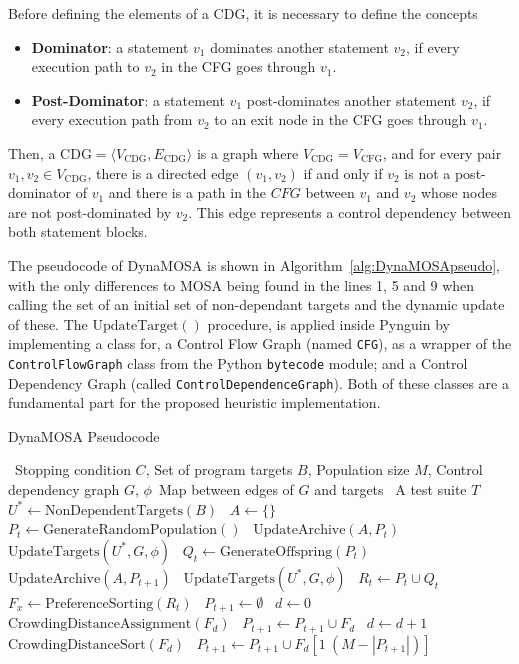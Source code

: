 \documentclass[%
  chapterprefix=false,%
  open=right,%
  twoside=true,%
  paper=a4,%
  logofile={Figures/logo.png},%
  thesistype=master,%
  UKenglish,%
]{se2thesis}
\newcommand{\classname}[1]{\texttt{#1}}
\begin{document}
Before defining the elements of a CDG, it is necessary to define the concepts
\begin{itemize}
  \item \textbf{Dominator}: a statement \(v_1\) dominates another statement \(v_2\), if every execution path to \(v_2\) in the CFG goes through \(v_1\).
  \item \textbf{Post-Dominator}: a statement \(v_1\) post-dominates another statement \(v_2\), if every execution path from \(v_2\) to an exit node in the CFG goes through \(v_1\).
\end{itemize}
Then, a \(\text{CDG} = \langle V_{\text{CDG}}, E_{\text{CDG}} \rangle\) is a graph where \(V_{\text{CDG}} = V_{\text{CFG}}\), and for every pair \(v_1, v_2 \in V_{\text{CDG}}\), there is a directed edge \((v_1, v_2)\) if and only if \(v_2\) is not a post-dominator of \(v_1\) and there is a path in the \(CFG\) between \(v_1\) and \(v_2\) whose nodes are not post-dominated by \(v_2\).
This edge represents a control dependency between both statement blocks.

The pseudocode of DynaMOSA is shown in Algorithm~\ref{alg:DynaMOSApseudo}, with the only differences to MOSA being found in the lines 1, 5 and 9 when calling the set of an initial set of non-dependant targets and the dynamic update of these.
The \(\text{UpdateTarget}()\) procedure, is applied inside Pynguin by implementing a class for, a Control Flow Graph (named \classname{CFG}), as a wrapper of the \classname{ControlFlowGraph} class from the Python \classname{bytecode} module; and a Control Dependency Graph (called \classname{ControlDependenceGraph}).
Both of these classes are a fundamental part for the proposed heuristic implementation.


\begin{algorithm}[htb]
  \centering
  \caption{DynaMOSA Pseudocode}\label{alg:DynaMOSApseudo}
  \begin{algorithmic}[1]
    \Require~Stopping condition \(C\), Set of program targets \(B\), Population size \(M\), Control dependency graph \(G\), \(\phi\)~Map between edges of \(G\) and targets
    \Ensure~A test suite \(T\)
    \State~\(U^* \gets \text{NonDependentTargets}(B)\)
    \State~\(A \gets \{\}\)
    \State~\(P_t \gets \text{GenerateRandomPopulation}()\)
    \State~\(\text{UpdateArchive}(A, P_t)\)
    \State~\(\text{UpdateTargets}(U^*, G, \phi)\)
      \State~\(Q_t \gets \text{GenerateOffspring}(P_t)\)
      \State~\(\text{UpdateArchive}(A, P_{t+1})\)
      \State~\(\text{UpdateTargets}(U^*, G, \phi)\)
      \State~\(R_t \gets P_t \cup Q_t\)
      \State~\(F_x \gets \text{PreferenceSorting}(R_t)\)
      \State~\(P_{t+1} \gets \emptyset \)
      \State~\(d \gets 0\)
        \State~\(\text{CrowdingDistanceAssignment}(F_d)\)
        \State~\(P_{t+1} \gets P_{t+1} \cup F_d\)
        \State~\(d \gets d + 1\)
      \EndWhile\@
      \State~\(\text{CrowdingDistanceSort}(F_d)\)
      \State~\(P_{t+1} \gets P_{t+1} \cup F_d[1\: (M - |P_{t+1}|)]\)
    \EndWhile\@
  \end{algorithmic}
\end{algorithm}
\end{document}
